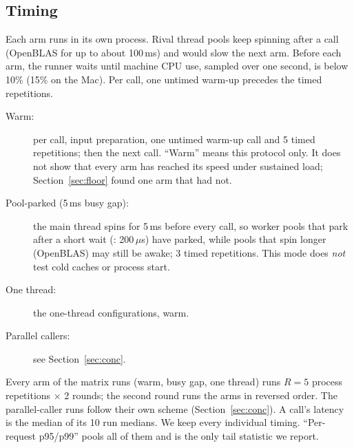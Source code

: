 \subsection{Timing}

Each arm runs in its own process.
Rival thread pools keep spinning after a call (OpenBLAS for up to about 100\,ms) and would slow the next arm.
Before each arm, the runner waits until machine CPU use, sampled over one second, is below 10\% (15\% on the Mac).
Per call, one untimed warm-up precedes the timed repetitions.
\begin{description}
\item[Warm:] per call, input preparation, one untimed warm-up call and 5 timed repetitions; then the next call. ``Warm'' means this protocol only. It does not show that every arm has reached its speed under sustained load; Section~\ref{sec:floor} found one arm that had not.
\item[Pool-parked (5\,ms busy gap):] the main thread spins for 5\,ms before every call, so worker pools that park after a short wait (\sweet: 200\,$\mu$s) have parked, while pools that spin longer (OpenBLAS) may still be awake; 3 timed repetitions. This mode does \emph{not} test cold caches or process start.
\item[One thread:] the one-thread configurations, warm.
\item[Parallel callers:] see Section~\ref{sec:conc}.
\end{description}
Every arm of the matrix runs (warm, busy gap, one thread) runs $R = 5$ process repetitions $\times$ 2 rounds; the second round runs the arms in reversed order. The parallel-caller runs follow their own scheme (Section~\ref{sec:conc}).
A call's latency is the median of its 10 run medians.
We keep every individual timing.
``Per-request p95/p99'' pools all of them and is the only tail statistic we report.

